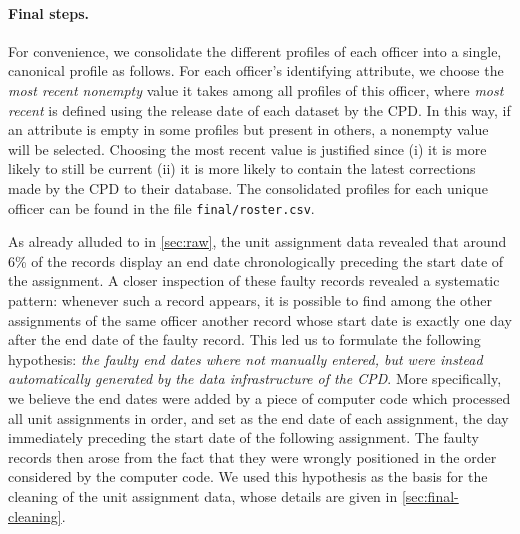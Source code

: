 \paragraph{Final steps.} For convenience, we consolidate the
different profiles of each officer into a single, canonical profile as follows.
For each officer's identifying attribute, we choose the \emph{most recent
nonempty} value it takes among all profiles of this officer, where \emph{most
recent} is defined using the release date of each dataset by the CPD. In this way,
if an attribute is empty in some profiles but present in others, a nonempty value
will be selected. Choosing the most recent value is justified since (i) it is
more likely to still be current (ii) it is more likely to contain the latest
corrections made by the CPD to their database. The consolidated profiles
for each unique officer can be found in the file \texttt{final/roster.csv}.

As already alluded to in \cref{sec:raw}, the unit assignment data revealed that
around 6\% of the records display an end date chronologically preceding the
start date of the assignment. A closer inspection of these faulty records
revealed a systematic pattern: whenever such a record appears, it is possible
to find among the other assignments of the same officer another record whose
start date is exactly one day after the end date of the faulty record. This led
us to formulate the following hypothesis: \emph{the faulty end dates where not
manually entered, but were instead automatically generated by the data
infrastructure of the CPD}.  More specifically, we believe the end dates were
added by a piece of computer code which processed all unit assignments in
order, and set as the end date of each assignment, the day immediately
preceding the start date of the following assignment. The faulty records then
arose from the fact that they were wrongly positioned in the order considered
by the computer code. We used this hypothesis as the basis for the cleaning of the unit assignment data, whose details are given in \cref{sec:final-cleaning}.

